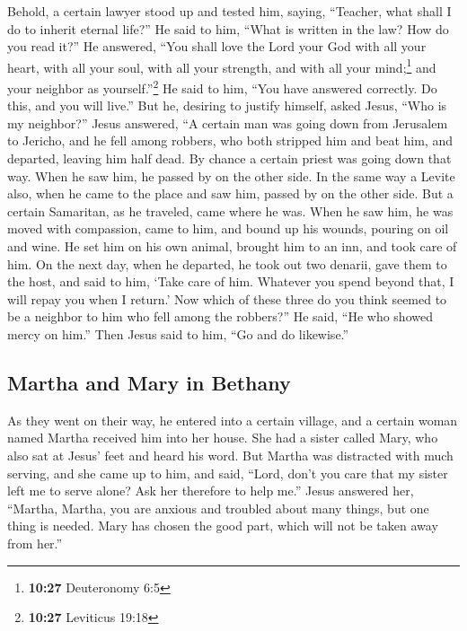  Behold, a certain lawyer stood up and tested him,
saying, ``Teacher, what shall I do to inherit eternal life?''
 He said to him, ``What is written in the law? How do you
read it?''  He answered, ``You shall love the Lord your
God with all your heart, with all your soul, with all your strength, and
with all your mind;\footnote{\textbf{10:27} Deuteronomy 6:5} and your
neighbor as yourself.''\footnote{\textbf{10:27} Leviticus 19:18}
 He said to him, ``You have answered correctly. Do this,
and you will live.''  But he, desiring to justify
himself, asked Jesus, ``Who is my neighbor?''  Jesus
answered, ``A certain man was going down from Jerusalem to Jericho, and
he fell among robbers, who both stripped him and beat him, and departed,
leaving him half dead.  By chance a certain priest was
going down that way. When he saw him, he passed by on the other side.
 In the same way a Levite also, when he came to the place
and saw him, passed by on the other side.  But a certain
Samaritan, as he traveled, came where he was. When he saw him, he was
moved with compassion,  came to him, and bound up his
wounds, pouring on oil and wine. He set him on his own animal, brought
him to an inn, and took care of him.  On the next day,
when he departed, he took out two denarii, gave them to the host, and
said to him, `Take care of him. Whatever you spend beyond that, I will
repay you when I return.'  Now which of these three do
you think seemed to be a neighbor to him who fell among the robbers?''
 He said, ``He who showed mercy on him.'' Then Jesus said
to him, ``Go and do likewise.''

\hypertarget{martha-and-mary-in-bethany}{%
\subsection{Martha and Mary in
Bethany}\label{martha-and-mary-in-bethany}}

 As they went on their way, he entered into a certain
village, and a certain woman named Martha received him into her house.
 She had a sister called Mary, who also sat at Jesus'
feet and heard his word.  But Martha was distracted with
much serving, and she came up to him, and said, ``Lord, don't you care
that my sister left me to serve alone? Ask her therefore to help me.''
 Jesus answered her, ``Martha, Martha, you are anxious
and troubled about many things,  but one thing is needed.
Mary has chosen the good part, which will not be taken away from her.''

